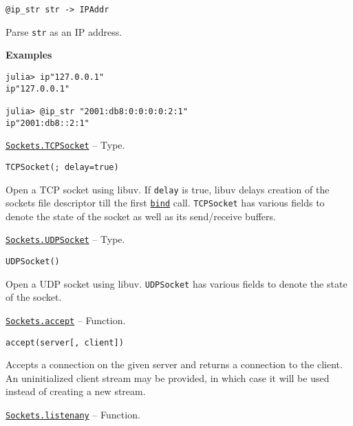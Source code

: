 \begin{adjustwidth}{2em}{0pt}


\begin{verbatim}
@ip_str str -> IPAddr
\end{verbatim}

Parse \texttt{str} as an IP address.

\textbf{Examples}


\begin{verbatim}
julia> ip"127.0.0.1"
ip"127.0.0.1"

julia> @ip_str "2001:db8:0:0:0:0:2:1"
ip"2001:db8::2:1"
\end{verbatim}



\end{adjustwidth}
\hypertarget{5453047654537213204}{} 
\hyperlink{5453047654537213204}{\texttt{Sockets.TCPSocket}}  -- {Type.}

\begin{adjustwidth}{2em}{0pt}


\begin{verbatim}
TCPSocket(; delay=true)
\end{verbatim}

Open a TCP socket using libuv. If \texttt{delay} is true, libuv delays creation of the socket{\textquotesingle}s file descriptor till the first \hyperlink{13811388816704022260}{\texttt{bind}} call. \texttt{TCPSocket} has various fields to denote the state of the socket as well as its send/receive buffers.



\end{adjustwidth}
\hypertarget{5627851531738059255}{} 
\hyperlink{5627851531738059255}{\texttt{Sockets.UDPSocket}}  -- {Type.}

\begin{adjustwidth}{2em}{0pt}


\begin{verbatim}
UDPSocket()
\end{verbatim}

Open a UDP socket using libuv. \texttt{UDPSocket} has various fields to denote the state of the socket.



\end{adjustwidth}
\hypertarget{1426793569216032849}{} 
\hyperlink{1426793569216032849}{\texttt{Sockets.accept}}  -- {Function.}

\begin{adjustwidth}{2em}{0pt}


\begin{verbatim}
accept(server[, client])
\end{verbatim}

Accepts a connection on the given server and returns a connection to the client. An uninitialized client stream may be provided, in which case it will be used instead of creating a new stream.



\end{adjustwidth}
\hypertarget{9909318444396548981}{} 
\hyperlink{9909318444396548981}{\texttt{Sockets.listenany}}  -- {Function.}

